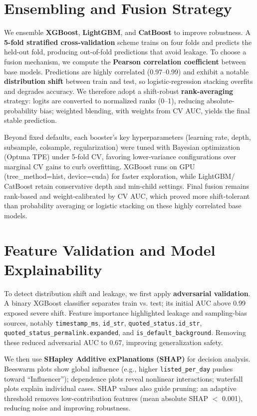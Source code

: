 \documentclass[twocolumn, a4paper, 10pt]{article}
\begin{document}
\section*{Ensembling and Fusion Strategy}

We ensemble \textbf{XGBoost}, \textbf{LightGBM}, and \textbf{CatBoost} to improve robustness. A \textbf{5-fold stratified cross-validation} scheme trains on four folds and predicts the held-out fold, producing out-of-fold predictions that avoid leakage. To choose a fusion mechanism, we compute the \textbf{Pearson correlation coefficient} between base models. Predictions are highly correlated (0.97–0.99) and exhibit a notable \textbf{distribution shift} between train and test, so logistic-regression stacking overfits and degrades accuracy. We therefore adopt a shift-robust \textbf{rank-averaging} strategy: logits are converted to normalized ranks (0–1), reducing absolute-probability bias; weighted blending, with weights from CV AUC, yields the final stable prediction.

Beyond fixed defaults, each booster’s key hyperparameters (learning rate, depth, subsample, colsample, regularization) were tuned with Bayesian optimization (Optuna TPE) under 5-fold CV, favoring lower-variance configurations over marginal CV gains to curb overfitting. XGBoost runs on GPU (tree_method=hist, device=cuda) for faster exploration, while LightGBM/​CatBoost retain conservative depth and min-child settings. Final fusion remains rank-based and weight-calibrated by CV AUC, which proved more shift-tolerant than probability averaging or logistic stacking on these highly correlated base models.

\section*{Feature Validation and Model Explainability}

To detect distribution shift and leakage, we first apply \textbf{adversarial validation}. A binary XGBoost classifier separates train vs. test; its initial AUC above 0.99 exposed severe shift. Feature importance highlighted leakage and sampling-bias sources, notably \texttt{timestamp\_ms}, \texttt{id\_str}, \texttt{quoted\_status.id\_str}, \texttt{quoted\_status\_permalink.expanded}, and \texttt{is\_default\_background}. Removing these reduced adversarial AUC to 0.67, improving generalization safety.

We then use \textbf{SHapley Additive exPlanations (SHAP)} for decision analysis. Beeswarm plots show global influence (e.g., higher \texttt{listed\_per\_day} pushes toward “Influencer”); dependence plots reveal nonlinear interactions; waterfall plots explain individual cases. SHAP values also guide pruning: an adaptive threshold removes low-contribution features (mean absolute SHAP $<$ 0.001), reducing noise and improving robustness.
\end{document}
